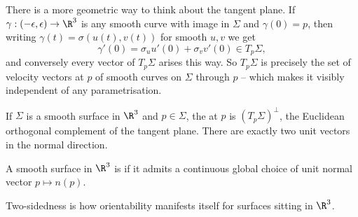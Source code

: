 There is a more geometric way to think about the tangent plane. If $\gamma: (-\epsilon, \epsilon) \rightarrow \R^3$ is any smooth curve with image in $\Sigma$ and $\gamma(0) = p$, then writing $\gamma(t) = \sigma(u(t), v(t))$ for smooth $u, v$ we get
$$
\gamma'(0) = \sigma_u u'(0) + \sigma_v v'(0) \in T_p \Sigma,
$$
and conversely every vector of $T_p \Sigma$ arises this way. So $T_p \Sigma$ is precisely the set of velocity vectors at $p$ of smooth curves on $\Sigma$ through $p$ -- which makes it visibly independent of any parametrisation.

\begin{definition}
    If $\Sigma$ is a smooth surface in $\R^3$ and $p \in \Sigma$, the  at $p$ is $(T_p \Sigma)^{\perp}$, the Euclidean orthogonal complement of the tangent plane. There are exactly two unit vectors in the normal direction.
\end{definition}

\begin{definition}
    A smooth surface in $\R^3$ is  if it admits a continuous global choice of unit normal vector $p \mapsto n(p)$.
\end{definition}

Two-sidedness is how orientability manifests itself for surfaces sitting in $\R^3$.

